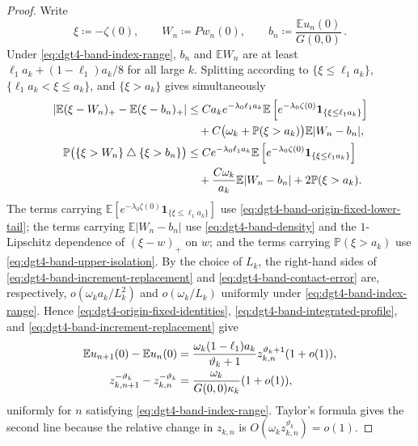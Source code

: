 \documentclass[11pt]{amsart}
\theoremstyle{plain}
\theoremstyle{definition}
\newcommand{\E}{\mathbb{E}}
\renewcommand{\P}{\mathbb{P}}
\newcommand{\one}{\mathbf{1}}
\begin{document}
\begin{proof}
		Write
		\[
			\xi\coloneqq-\zeta(0),\qquad
			W_n\coloneqq Pw_n(0),\qquad
			b_n\coloneqq\frac{\E u_n(0)}{G(0,0)}\, .
		\]
	Under \eqref{eq:dgt4-band-index-range}, $b_n$ and $\E W_n$ are at least
	$\ell_{1} a_k+(1-\ell_{1})a_k/8$ for all large $k$. Splitting according to
	$\{\xi\leq\ell_{1} a_k\}$, $\{\ell_{1} a_k<\xi\leq a_k\}$, and
	$\{\xi>a_k\}$ gives simultaneously
		\begin{align}
		\left|\E(\xi-W_n)_+-\E(\xi-b_n)_+\right|
		&\leq
		Ca_ke^{-\lambda_{0}\ell_{1} a_k}
		\E\left[e^{-\lambda_{0}\zeta(0)}
		\one_{\{\xi\leq\ell_{1} a_k\}}\right]\notag\\
		&\quad+
		C\bigl(\omega_k+\P(\xi>a_k)\bigr)\E|W_n-b_n|,
		\label{eq:dgt4-band-increment-replacement}\\
		\P\bigl(\{\xi>W_n\}\mathbin{\triangle}\{\xi>b_n\}\bigr)
		&\leq
		Ce^{-\lambda_{0}\ell_{1} a_k}
		\E\left[e^{-\lambda_{0}\zeta(0)}
		\one_{\{\xi\leq\ell_{1} a_k\}}\right]\notag\\
		&\quad+
		\frac{C\omega_k}{a_k}\E|W_n-b_n|
		+2\P(\xi>a_k).
		\label{eq:dgt4-band-contact-error}
		\end{align}
	The terms carrying $\E[e^{-\lambda_{0}\zeta(0)}\one_{\{\xi\leq\ell_{1} a_k\}}]$ use
	\eqref{eq:dgt4-band-origin-fixed-lower-tail}; the terms carrying $\E|W_n-b_n|$ use
	\eqref{eq:dgt4-band-density} and the $1$-Lipschitz dependence of $(\xi-w)_+$ on $w$; and the
	terms carrying $\P(\xi>a_k)$ use \eqref{eq:dgt4-band-upper-isolation}. By the choice of
	$L_k$, the right-hand sides of
	\eqref{eq:dgt4-band-increment-replacement} and
	\eqref{eq:dgt4-band-contact-error} are, respectively,
	$o(\omega_ka_k/L_k^2)$ and $o(\omega_k/L_k)$ uniformly under
	\eqref{eq:dgt4-band-index-range}. Hence
	\eqref{eq:dgt4-origin-fixed-identities},
	\eqref{eq:dgt4-band-integrated-profile}, and
	\eqref{eq:dgt4-band-increment-replacement} give
	\begin{align}
		\E u_{n+1}(0)-\E u_n(0)
		&=
		\frac{\omega_k(1-\ell_{1})a_k}{\vartheta_k+1}
		z_{k,n}^{\vartheta_k+1}(1+o(1)),\notag\\
		z_{k,n+1}^{-\vartheta_k}-z_{k,n}^{-\vartheta_k}
		&=
		\frac{\omega_k}{G(0,0)\kappa_k}(1+o(1)),
		\label{eq:dgt4-band-one-step-profile}
	\end{align}
	uniformly for $n$ satisfying \eqref{eq:dgt4-band-index-range}. Taylor's
	formula gives the second line because the relative change in
	$z_{k,n}$ is $O(\omega_kz_{k,n}^{\vartheta_k})=o(1)$.


\end{proof}
\end{document}
